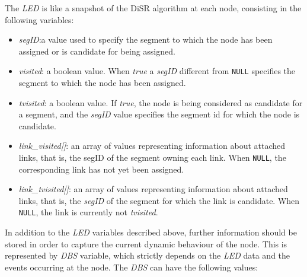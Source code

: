 The \emph{LED} is like a snapshot of the DiSR algorithm at each node,
consisting in the following variables:
\begin{itemize}
\item{\emph{segID}}:a value used to specify the segment to which the
node has been assigned or is candidate for being assigned.
\item{\emph{visited}}: a boolean value. When \emph{true}
a \emph{segID} different from \texttt{NULL} specifies the segment 
to which the node has been assigned. 
\item{\emph{tvisited}}: a boolean value. If \emph{true}, the node is
being considered as candidate for a segment, and the \emph{segID} value
specifies the segment id for which the node is candidate. 
\item{\emph{link\_visited[]}}: an array
of values representing information about attached links, that is, the
segID of the segment owning each link. When \texttt{NULL}, the corresponding link has not yet been
assigned.
\item{\emph{link\_tvisited[]}}: an array of
values representing information about attached links, that is, the \emph{segID} of
the segment for which the link is candidate. When \texttt{NULL}, the link is
currently not \emph{tvisited}.  
\end{itemize}

In addition to the \emph{LED} variables described above, further
information should be stored in order to capture the current dynamic
behaviour of the node. This is represented by \emph{DBS} variable,
which strictly depends on the \emph{LED} data and the events occurring
at the node. The \emph{DBS} can have the following values:


